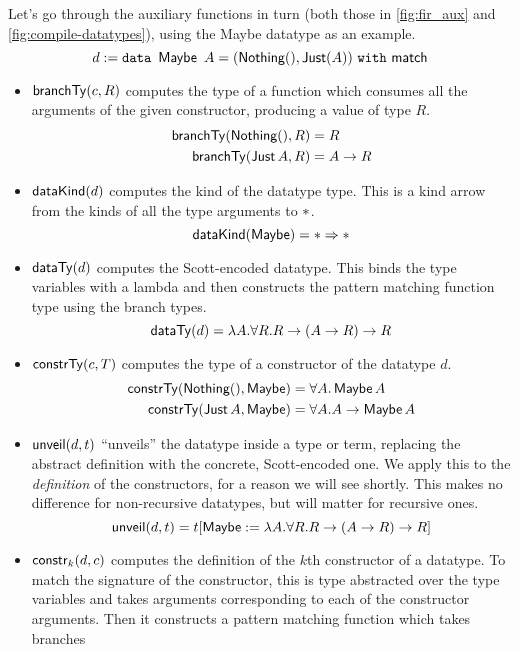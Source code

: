 \noindent Let's go through the auxiliary functions in turn (both those in \cref{fig:fir_aux} and
\cref{fig:compile-datatypes}), using the Maybe datatype as an example.
\begin{displaymath}
d \defeq \datatype{\Maybe}{A}{\Match}{(\Nothing (), \Just (A))}
\end{displaymath}
\begin{itemize}
\item $\branchTy{c}{R}$ computes the type of a function which consumes all the
  arguments of the given constructor, producing a value of type $R$.
  \begin{align*}
  \branchTy{\Nothing ()}{R} &= R\\
  \branchTy{\Just A}{R} &= A \rightarrow R
  \end{align*}
\item $\dataKind{d}$ computes the kind of the datatype type. This is a kind
  arrow from the kinds of all the type arguments to $\Type$.
  $$\dataKind{\Maybe} = \Type \kindArrow \Type$$
\item $\scottTy{d}$ computes the Scott-encoded datatype. This binds the type
  variables with a lambda and then constructs the pattern matching function type
  using the branch types.
  $$\scottTy{d} = \lambda A . \forall R . R \rightarrow (A \rightarrow R) \rightarrow R$$
\item $\constrTy{c}{T}$ computes the type of a constructor of the datatype $d$.
  \begin{align*}
  \constrTy{\Nothing ()}{\Maybe} &= \forall A . \Maybe A\\
  \constrTy{\Just A}{\Maybe} &= \forall A . A \rightarrow \Maybe A
  \end{align*}
\item $\unveil{d}{t}$ ``unveils'' the datatype inside a type or term, replacing
  the abstract definition with the concrete, Scott-encoded one. We apply this to
  the \emph{definition} of the constructors, for a reason we will see shortly.
  This makes no difference for non-recursive datatypes, but will matter for
  recursive ones.
  $$\unveil{d}{t} = \substIn{\Maybe}{\lambda A . \forall R . R \rightarrow (A \rightarrow R) \rightarrow R}{t}$$
\item $\constr{d}{c}{k}$ computes the definition of the $k$th constructor of a datatype. To match
  the signature of the constructor, this is type abstracted over the type
  variables and takes arguments corresponding to each of the constructor
  arguments. Then it constructs a pattern matching function which takes branches

\end{itemize}
